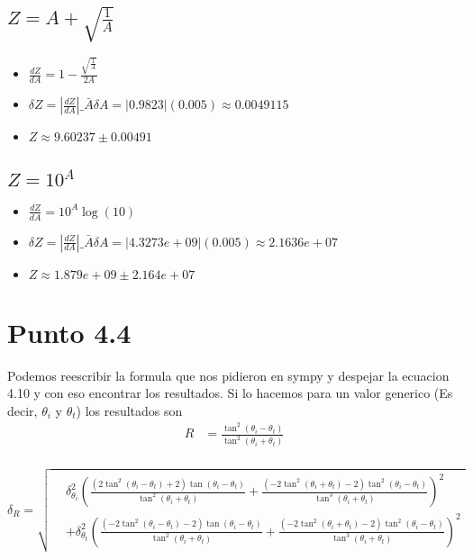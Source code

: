 \documentclass[12pt]{exam}
\begin{document}
\subsection{$Z = A + \sqrt{\frac{1}{A}}$}
\begin{itemize}
\item $\frac{dZ}{dA} = 1 - \frac{\sqrt{\frac{1}{A}}}{2 A}$
\item $\delta Z = \left|\frac{dZ}{dA}\right|\_{\bar{A}} \delta A = |0.9823|(0.005) \approx 0.0049115$
\item $Z \approx 9.60237 \pm 0.00491$
\end{itemize}
\vspace{0.5cm}

\subsection{$Z = 10^A$}
\begin{itemize}
\item $\frac{dZ}{dA} = 10^{A} \log{\left(10 \right)}$
\item $\delta Z = \left|\frac{dZ}{dA}\right|\_{\bar{A}} \delta A = |4.3273e+09|(0.005) \approx 2.1636e+07$
\item $Z \approx 1.879e+09 \pm 2.164e+07$
\end{itemize}
\vspace{0.5cm}

\section{Punto 4.4}

Podemos reescribir la formula que nos pidieron en sympy y despejar la ecuacion 4.10 y con eso encontrar los resultados. Si lo hacemos para un valor generico (Es decir, $\theta_i$ y $\theta_t$) los resultados son
\begin{align*}
  R &= \frac{\tan^{2}{\left(\theta_{i} - \theta_{t} \right)}}{\tan^{2}{\left(\theta_{i} + \theta_{t} \right)}}\\
\end{align*}

\[
\delta_R = \sqrt{
  \begin{aligned}
    &\delta_{\theta_i}^{2} \left(
      \frac{
        \left(2 \tan^{2}{\left(\theta_{i} - \theta_{t} \right)} + 2\right)
        \tan{\left(\theta_{i} - \theta_{t} \right)}
      }{
        \tan^{2}{\left(\theta_{i} + \theta_{t} \right)}
      } 
      + 
      \frac{
        \left(- 2 \tan^{2}{\left(\theta_{i} + \theta_{t} \right)} - 2\right)
        \tan^{2}{\left(\theta_{i} - \theta_{t} \right)}
      }{
        \tan^{3}{\left(\theta_{i} + \theta_{t} \right)}
      }
    \right)^{2}
    \\
    &+ \delta_{\theta_t}^{2} \left(
      \frac{
        \left(- 2 \tan^{2}{\left(\theta_{i} - \theta_{t} \right)} - 2\right)
        \tan{\left(\theta_{i} - \theta_{t} \right)}
      }{
        \tan^{2}{\left(\theta_{i} + \theta_{t} \right)}
      } 
      + 
      \frac{
        \left(- 2 \tan^{2}{\left(\theta_{i} + \theta_{t} \right)} - 2\right)
        \tan^{2}{\left(\theta_{i} - \theta_{t} \right)}
      }{
        \tan^{3}{\left(\theta_{i} + \theta_{t} \right)}
      }
    \right)^{2}
  \end{aligned}
}
\]
\end{document}
